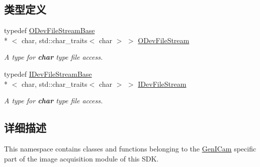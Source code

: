 \subsection*{类型定义}
\begin{DoxyCompactItemize}
\item 
typedef \hyperlink{classmv_i_m_p_a_c_t_1_1acquire_1_1_gen_i_cam_1_1_o_dev_file_stream_base}{O\+Dev\+File\+Stream\+Base}\\*
$<$ char, std\+::char\+\_\+traits$<$ char $>$ $>$ \hyperlink{group___gen_i_cam_interface_file_stream_ga7d9df27b854d193a06556bda6f1a9488}{O\+Dev\+File\+Stream}
\begin{DoxyCompactList}\small\item\em A type for {\bfseries char} type file access. \end{DoxyCompactList}\item 
typedef \hyperlink{classmv_i_m_p_a_c_t_1_1acquire_1_1_gen_i_cam_1_1_i_dev_file_stream_base}{I\+Dev\+File\+Stream\+Base}\\*
$<$ char, std\+::char\+\_\+traits$<$ char $>$ $>$ \hyperlink{group___gen_i_cam_interface_file_stream_ga35f546ea58f515c24771b20132efacbc}{I\+Dev\+File\+Stream}
\begin{DoxyCompactList}\small\item\em A type for {\bfseries char} type file access. \end{DoxyCompactList}\end{DoxyCompactItemize}


\subsection{详细描述}
This namespace contains classes and functions belonging to the \hyperlink{namespacemv_i_m_p_a_c_t_1_1acquire_1_1_gen_i_cam}{Gen\+I\+Cam} specific part of the image acquisition module of this S\+D\+K. 